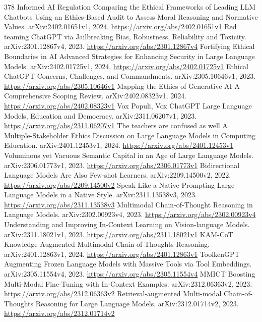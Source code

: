 \documentclass[11pt]{article}
\begin{document}
\begin{thebibliography}{378}
 Informed AI Regulation Comparing the Ethical Frameworks of Leading LLM Chatbots Using an Ethics-Based Audit to Assess Moral Reasoning and Normative Values. arXiv:2402.01651v1, 2024. \url{https://arxiv.org/abs/2402.01651v1}
 Red teaming ChatGPT via Jailbreaking Bias, Robustness, Reliability and Toxicity. arXiv:2301.12867v4, 2023. \url{https://arxiv.org/abs/2301.12867v4}
 Fortifying Ethical Boundaries in AI Advanced Strategies for Enhancing Security in Large Language Models. arXiv:2402.01725v1, 2024. \url{https://arxiv.org/abs/2402.01725v1}
 Ethical ChatGPT Concerns, Challenges, and Commandments. arXiv:2305.10646v1, 2023. \url{https://arxiv.org/abs/2305.10646v1}
 Mapping the Ethics of Generative AI A Comprehensive Scoping Review. arXiv:2402.08323v1, 2024. \url{https://arxiv.org/abs/2402.08323v1}
 Vox Populi, Vox ChatGPT Large Language Models, Education and Democracy. arXiv:2311.06207v1, 2023. \url{https://arxiv.org/abs/2311.06207v1}
 The teachers are confused as well A Multiple-Stakeholder Ethics Discussion on Large Language Models in Computing Education. arXiv:2401.12453v1, 2024. \url{https://arxiv.org/abs/2401.12453v1}
 Voluminous yet Vacuous Semantic Capital in an Age of Large Language Models. arXiv:2306.01773v1, 2023. \url{https://arxiv.org/abs/2306.01773v1}
 Bidirectional Language Models Are Also Few-shot Learners. arXiv:2209.14500v2, 2022. \url{https://arxiv.org/abs/2209.14500v2}
 Speak Like a Native Prompting Large Language Models in a Native Style. arXiv:2311.13538v3, 2023. \url{https://arxiv.org/abs/2311.13538v3}
 Multimodal Chain-of-Thought Reasoning in Language Models. arXiv:2302.00923v4, 2023. \url{https://arxiv.org/abs/2302.00923v4}
 Understanding and Improving In-Context Learning on Vision-language Models. arXiv:2311.18021v1, 2023. \url{https://arxiv.org/abs/2311.18021v1}
 KAM-CoT Knowledge Augmented Multimodal Chain-of-Thoughts Reasoning. arXiv:2401.12863v1, 2024. \url{https://arxiv.org/abs/2401.12863v1}
 ToolkenGPT Augmenting Frozen Language Models with Massive Tools via Tool Embeddings. arXiv:2305.11554v4, 2023. \url{https://arxiv.org/abs/2305.11554v4}
 MMICT Boosting Multi-Modal Fine-Tuning with In-Context Examples. arXiv:2312.06363v2, 2023. \url{https://arxiv.org/abs/2312.06363v2}
 Retrieval-augmented Multi-modal Chain-of-Thoughts Reasoning for Large Language Models. arXiv:2312.01714v2, 2023. \url{https://arxiv.org/abs/2312.01714v2}

\end{thebibliography}
\end{document}
